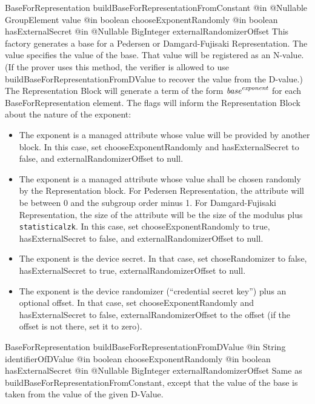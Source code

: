       \begin{method}
      {BaseForRepresentation}
      {buildBaseForRepresentationFromConstant}
      {
        {@in @Nullable GroupElement value}
        {@in boolean chooseExponentRandomly}
        {@in boolean hasExternalSecret}
        {@in @Nullable BigInteger externalRandomizerOffset}
      }
      This factory generates a base for a Pedersen or Damgard-Fujisaki Representation.
      The value specifies the value of the base. That value will be registered as an N-value.
      (If the prover uses this method, the verifier is allowed to use
      buildBaseForRepresentationFromDValue to recover the value from the D-value.)
      The Representation Block will generate
      a term of the form $\emph{base}^{\emph{exponent}}$ for each BaseForRepresentation element.
      The flags will inform the Representation Block about the nature of the exponent:
      \begin{itemize}
        \item The exponent is a managed attribute whose value will be provided by another block.
          In this case, set chooseExponentRandomly and hasExternalSecret to false, and externalRandomizerOffset to null.
        \item The exponent is a managed attribute whose value shall be chosen randomly by the Representation block.
          For Pedersen Representation, the attribute will be between 0 and the subgroup order minus 1.
          For Damgard-Fujisaki Representation, the size of the attribute will be the size of the modulus plus \texttt{statisticalzk}.
          In this case, set chooseExponentRandomly to true, hasExternalSecret to false, and externalRandomizerOffset to null.
        \item The exponent is the device secret. In that case, set choseRandomizer to false, hasExternalSecret to true,
          externalRandomizerOffset to null.
        \item The exponent is the device randomizer (``credential secret key'') plus an optional offset.
          In that case, set chooseExponentRandomly and hasExternalSecret to false, externalRandomizerOffset to the offset
          (if the offset is not there, set it to zero).
      \end{itemize}
      \end{method}
      \begin{method}
      {BaseForRepresentation}
      {buildBaseForRepresentationFromDValue}
      {
        {@in String identifierOfDValue}
        {@in boolean chooseExponentRandomly}
        {@in boolean hasExternalSecret}
        {@in @Nullable BigInteger externalRandomizerOffset}
      }
      Same as buildBaseForRepresentationFromConstant, except that
      the value of the base is taken from the value of the given D-Value.
      \end{method}

